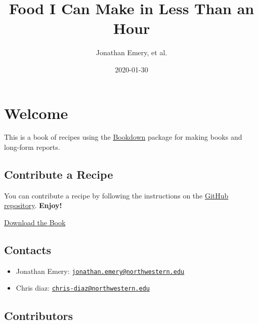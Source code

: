 \documentclass[openany]{book}
\title{Food I Can Make in Less Than an Hour}
\author{Jonathan Emery, et al.}
\date{2020-01-30}
\providecommand{\tightlist}{%
  \setlength{\itemsep}{0pt}\setlength{\parskip}{0pt}}
\begin{document}
\maketitle

{
\setcounter{tocdepth}{1}
\tableofcontents
}
\chapter*{Welcome}\label{welcome}

This is a book of recipes using the
\href{https://bookdown.org/}{Bookdown} package for making books and
long-form reports.

\section*{Contribute a Recipe}\label{contribute-a-recipe}

You can contribute a recipe by following the instructions on the
\href{https://github.com/chrisdaaz/recipe-bookdown}{GitHub repository}.
\textbf{Enjoy!}

\href{./recipe-bookdown.pdf}{Download the Book}

\section*{Contacts}\label{contacts}

\begin{itemize}
\tightlist
\item
  Jonathan Emery:
  \href{mailto:jonathan.emery@northwestern.edu}{\nolinkurl{jonathan.emery@northwestern.edu}}
\item
  Chris diaz:
  \href{mailto:chris-diaz@northwestern.edu}{\nolinkurl{chris-diaz@northwestern.edu}}
\end{itemize}

\section*{Contributors}\label{contributors}
\end{document}
